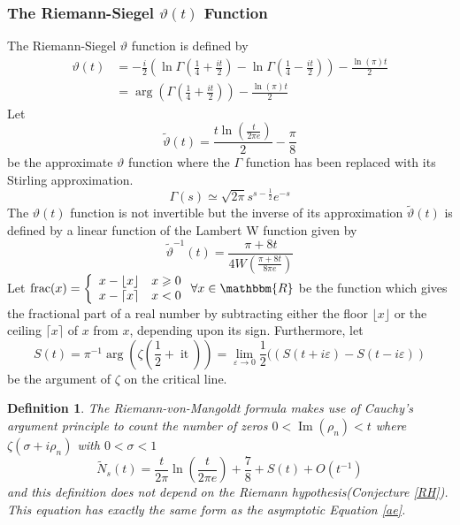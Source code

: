 \documentclass{article}
\newcommand{\nobracket}{}
\newcommand{\tmop}[1]{\ensuremath{\operatorname{#1}}}
\newcommand{\tmverbatim}[1]{{\ttfamily{#1}}}
\newtheorem{definition}{Definition}
\begin{document}
\subsubsection{The Riemann-Siegel $\vartheta (t)$ Function}

The Riemann-Siegel $\vartheta$ function is defined by
\begin{equation}
  \begin{array}{cl}
    \vartheta (t) & = - \frac{i}{2} \left( \ln \Gamma \left( \frac{1}{4} +
    \frac{i t}{2} \right) - \ln \Gamma \left( \frac{1}{4} - \frac{i t}{2}
    \right) \right) - \frac{\ln (\pi) t}{2} \text{}\\
    & = \arg \left( \Gamma \left( \frac{1}{4} + \frac{i t}{2} \right) \right)
    - \frac{\ln (\pi) t}{2}
  \end{array}
\end{equation}
Let
\[ \tilde{\vartheta} (t) = \frac{t \ln \left( \frac{t}{2 \pi e} \right)}{2} -
   \frac{\pi}{8} \]
be the approximate $\vartheta$ function where the $\Gamma$ function has been
replaced with its Stirling approximation.
\begin{equation}
  \Gamma (s) \simeq \sqrt{2 \pi} s^{s - \frac{1}{2}} e^{- s}
\end{equation}
The $\vartheta (t)$ function is not invertible but the inverse of its
approximation $\tilde{\vartheta} (t)$ is defined by a linear function of the
Lambert W function given by
\begin{equation}
  \tilde{\vartheta}^{- 1} (t) = \frac{\pi + 8 t}{4 W \left( \frac{\pi + 8 t}{8
  \pi e} \right)}
\end{equation}
Let $\tmop{frac} (x) = \left\{ \begin{array}{ll}
  x - \lfloor x \rfloor & x \geqslant 0\\
  x - \lceil x \rceil & x < 0
\end{array} \right. \forall x \in \mathbbm{R}$ be the function which gives the
fractional part of a real number by subtracting either the floor $\lfloor x
\rfloor$ or the ceiling $\lceil x \rceil$ of $x$ from $x$, depending upon its
sign. Furthermore, let
\begin{equation}
  S (t) = \pi^{- 1} \arg \left( \zeta \left( \frac{1}{2} + \tmop{it} \right)
  \right) = \lim_{\varepsilon \rightarrow 0}  \frac{1}{2} ((S \nobracket (t +
  i \varepsilon) - S (t - i \varepsilon))
\end{equation}
be the argument of $\zeta$ on the critical line.

\begin{definition}
  The Riemann-von-Mangoldt formula makes use of Cauchy's argument principle to
  count the number of zeros \tmverbatim{inside the critical strip} $0 <
  \tmop{Im} (\rho_n) < t$ where $\zeta (\sigma + i \rho_n)$ with $0 < \sigma <
  1$
  \begin{equation}
    \tilde{N}_s (t) = \frac{t}{2 \pi} \ln \left( \frac{t}{2 \pi e} \right) +
    \frac{7}{8} + S (t) + O (t^{- 1})
  \end{equation}
  and this definition does not depend on the Riemann hypothesis(Conjecture
  \ref{RH}). This equation has exactly the same form as the asymptotic
  Equation \ref{ae}. {\cite[Equation 15]{z0t}}
\end{definition}
\end{document}

